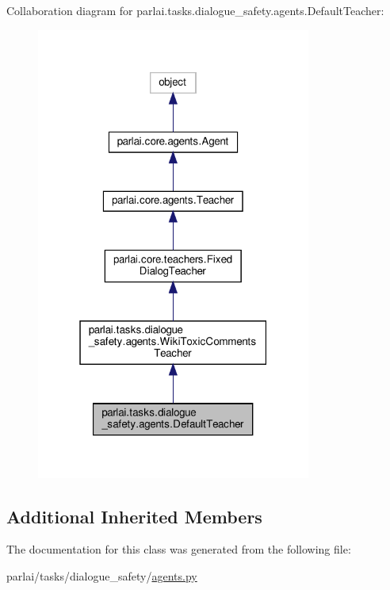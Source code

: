 Collaboration diagram for parlai.\+tasks.\+dialogue\+\_\+safety.\+agents.\+Default\+Teacher\+:
\nopagebreak
\begin{figure}[H]
\begin{center}
\leavevmode
\includegraphics[width=256pt]{classparlai_1_1tasks_1_1dialogue__safety_1_1agents_1_1DefaultTeacher__coll__graph}
\end{center}
\end{figure}
\subsection*{Additional Inherited Members}


The documentation for this class was generated from the following file\+:\begin{DoxyCompactItemize}
\item 
parlai/tasks/dialogue\+\_\+safety/\hyperlink{parlai_2tasks_2dialogue__safety_2agents_8py}{agents.\+py}\end{DoxyCompactItemize}
